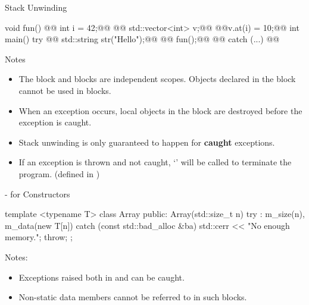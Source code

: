 \documentclass{beamer}
\newcommand{\Highlight}{\makebox[0pt][l]{\color{pink}\rule[-4pt]{\textwidth}{11pt}}}
\begin{document}
\begin{frame}[fragile]{Stack Unwinding}
  \begin{cpp}
void fun() {
@\onslide<3>{\Highlight}@  int i = 42;@@
@\onslide<2>{\Highlight}@  std::vector<int> v;@@
@\onslide<1>{\Highlight\danger}@v.at(i) = 10;@@
}
int main() {
  try {
@\onslide<5>{\Highlight}@    std::string str("Hello");@@
@\onslide<4>{\Highlight}@    fun();@@
@\onslide<6>{\Highlight}@  } catch (...) {}@@
}
  \end{cpp}
\end{frame}

\begin{frame}[fragile]{Notes}
  \begin{itemize}
    \item The  block and  blocks are independent scopes. Objects declared in the  block cannot be used in  blocks.
    \item When an exception occurs, local objects in the  block are destroyed before the exception is caught.
    \item Stack unwinding is only guaranteed to happen for \textbf{caught} exceptions.
    \item If an exception is thrown and not caught, `' will be called to terminate the program. (defined in )
  \end{itemize}
\end{frame}

\begin{frame}[fragile]{- for Constructors}
  \begin{cpp}
template <typename T>
class Array {
 public:
  Array(std::size_t n)
      try : m_size(n), m_data(new T[n]{}) {}
  catch (const std::bad_alloc &ba) {
    std::cerr << "No enough memory.\n";
    throw;
  }
};
  \end{cpp}
  Notes:
  \begin{itemize}
    \item Exceptions raised both in  and  can be caught.
    \item Non-static data members cannot be referred to in such  blocks. 
  \end{itemize}
\end{frame}
\end{document}
